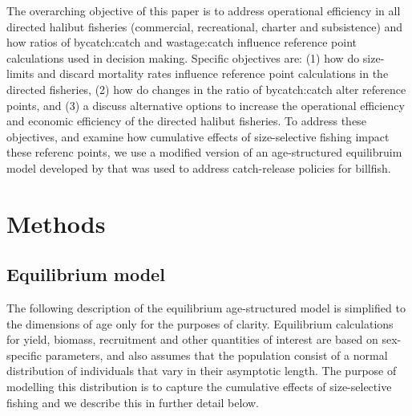 \documentclass[12pt,leqno]{article}
\begin{document}
The overarching objective of this paper is to address operational efficiency in all directed halibut fisheries (commercial, recreational, charter and subsistence) and how ratios of bycatch:catch and wastage:catch influence reference point calculations used in decision making. Specific objectives are: (1) how do size-limits and discard mortality rates influence reference point calculations in the directed fisheries, (2) how do changes in the ratio of bycatch:catch alter reference points, and (3) a discuss alternative options to increase the operational efficiency and economic efficiency of the directed halibut fisheries.  To address these objectives, and examine how cumulative effects of size-selective fishing impact these referenc points, we use a modified version of an age-structured equilibruim model developed by \cite{pineiii2008car} that was used to address catch-release policies for billfish.


%
%
\section*{Methods}
\label{sec:methods}

\subsection*{Equilibrium model} %
\label{sub:equilibrium_model}
The following description of the equilibrium age-structured model is simplified to the dimensions of age only for the purposes of clarity.  Equilibrium calculations for yield, biomass, recruitment and other quantities of interest are based on sex-specific parameters, and also assumes that the population consist of a normal distribution of individuals that vary in their asymptotic length.  The purpose of modelling this distribution is to capture the cumulative effects of size-selective fishing and we describe this in further detail below.
\end{document}
